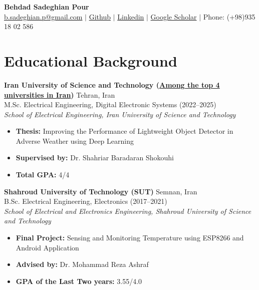 \documentclass[10pt,a4paper]{article}
\begin{document}
	
	\begin{center}
		{\Huge \textbf{Behdad Sadeghian Pour}} \\ \vspace{8pt}
		\href{mailto:b.sadeghian.p@gmail.com}{b.sadeghian.p@gmail.com} \quad $|$ \quad
		\href{https://github.com/BehdadSDP}{Github} \quad $|$ \quad
		\href{https://linkedin.com/in/behdad-sadeghian-pour-911444215}{Linkedin} \quad $|$ \quad
		\href{https://scholar.google.com/citations?user=UFMWsvYAAAAJ&hl=en}{Google Scholar} \quad $|$ \quad
		Phone: (+98)935 18 02 586
	\end{center}

	\section{Educational Background}
	
	\textbf{Iran University of Science and Technology (\href{https://www.topuniversities.com/world-university-rankings?region=Asia&countries=ir}{Among the top 4 universities in Iran})} \hfill Tehran, Iran \\
	M.Sc. Electrical Engineering, Digital Electronic Systems \hfill (2022--2025) \\
	\textit{School of Electrical Engineering, Iran University of Science and Technology}
	\begin{itemize}
		\item \textbf{Thesis:} Improving the Performance of Lightweight Object Detector in Adverse Weather using Deep Learning
		\item \textbf{Supervised by:} Dr. Shahriar Baradaran Shokouhi
		\item \textbf{Total GPA:} 4/4 
	\end{itemize}
	
	\vspace{8pt}
	
	\textbf{Shahroud University of Technology (SUT)} \hfill Semnan, Iran \\
	B.Sc. Electrical Engineering, Electronics \hfill (2017--2021) \\
	\textit{School of Electrical and Electronics Engineering, Shahroud University of Science and Technology}
	\begin{itemize}
		\item \textbf{Final Project:} Sensing and Monitoring Temperature using ESP8266 and Android Application
		\item \textbf{Advised by:} Dr. Mohammad Reza Ashraf
		\item \textbf{GPA of the Last Two years:} 3.55/4.0
	\end{itemize}
	
\end{document}
